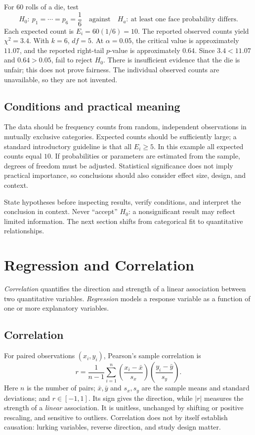\documentclass[11pt]{article}
\begin{document}
For $60$ rolls of a die, test
\[
H_0:\ p_1=\cdots=p_6=\frac16
\quad\text{against}\quad
H_a:\ \text{at least one face probability differs}.
\]
Each expected count is $E_i=60(1/6)=10$.  The reported observed counts yield
$\chi^2=3.4$.  With $k=6$, $df=5$.  At $\alpha=0.05$, the critical value is
approximately $11.07$, and the reported right-tail $p$-value is approximately
$0.64$.  Since $3.4<11.07$ and $0.64>0.05$, fail to reject $H_0$.  There is
insufficient evidence that the die is unfair; this does not prove fairness.
The individual observed counts are unavailable, so they are not invented.

\subsection{Conditions and practical meaning}
The data should be frequency counts from random, independent observations in
mutually exclusive categories.  Expected counts should be sufficiently large;
a standard introductory guideline is that all $E_i\ge5$.  In this example
all expected counts equal $10$.  If probabilities or parameters are estimated
from the sample, degrees of freedom must be adjusted.  Statistical significance
does not imply practical importance, so conclusions should also consider
effect size, design, and context.

\begin{keybox}
State hypotheses before inspecting results, verify conditions, and interpret
the conclusion in context.  Never ``accept'' $H_0$: a nonsignificant result
may reflect limited information.  The next section shifts from categorical
fit to quantitative relationships.
\end{keybox}

\section{Regression and Correlation}\label{sec:regression}
\emph{Correlation} quantifies the direction and strength of a linear
association between two quantitative variables.  \emph{Regression} models a
response variable as a function of one or more explanatory variables.

\subsection{Correlation}
For paired observations $(x_i,y_i)$, Pearson's sample correlation is
\begin{equation}\label{eq:r}
r=\frac{1}{n-1}\sum_{i=1}^{n}
\left(\frac{x_i-\bar{x}}{s_x}\right)
\left(\frac{y_i-\bar{y}}{s_y}\right).
\end{equation}
Here $n$ is the number of pairs; $\bar{x},\bar{y}$ and $s_x,s_y$ are the
sample means and standard deviations; and $r\in[-1,1]$.  Its sign gives the
direction, while $|r|$ measures the strength of a \emph{linear} association.
It is unitless, unchanged by shifting or positive rescaling, and sensitive to
outliers.  Correlation does not by itself establish causation: lurking
variables, reverse direction, and study design matter.
\end{document}
